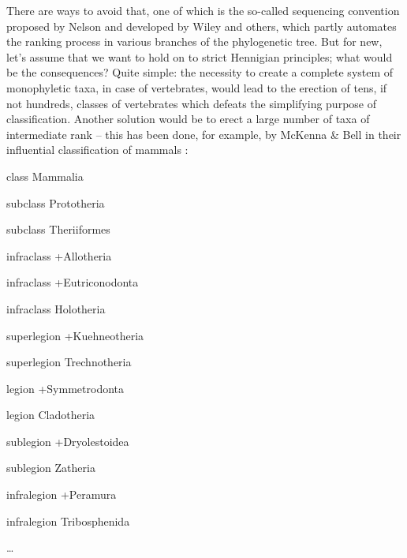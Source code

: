 \begin{artengenv}
There are ways to avoid that, one of which is the so-called sequencing convention proposed by Nelson
\parencite*{nelson_phylogenetic_1972}
and developed by Wiley
\parencite*{wiley_phylogenetics:_1981}
and others, which partly
automates the ranking process in various branches of the phylogenetic tree. But for new, let’s assume that we want to
hold on to strict Hennigian principles; what would be the consequences? Quite simple: the necessity to create a
complete system of monophyletic taxa, in case of vertebrates, would lead to the erection of tens, if not hundreds,
classes of vertebrates which defeats the simplifying purpose of classification. Another solution would be to erect a
large number of taxa of intermediate rank -- this has been done, for example, by McKenna \& Bell in their influential
classification of mammals
\parencite{mckenna_classification_1997}:

\begin{longitemize}
\item class Mammalia
\begin{longitemize}
\item subclass Prototheria
\item subclass Theriiformes
\begin{longitemize}
\item infraclass +Allotheria
\item infraclass +Eutriconodonta
\item infraclass Holotheria
\begin{longitemize}
\item superlegion +Kuehneotheria
\item superlegion Trechnotheria
\begin{longitemize}
\item legion +Symmetrodonta
\item legion Cladotheria
\begin{longitemize}
\item sublegion +Dryolestoidea
\item sublegion Zatheria
\begin{longitemize}
\item infralegion +Peramura
\item infralegion Tribosphenida
\item \ldots
\end{longitemize}
\end{longitemize}
\end{longitemize}
\end{longitemize}
\end{longitemize}
\end{longitemize}
\end{longitemize}


\end{artengenv}
